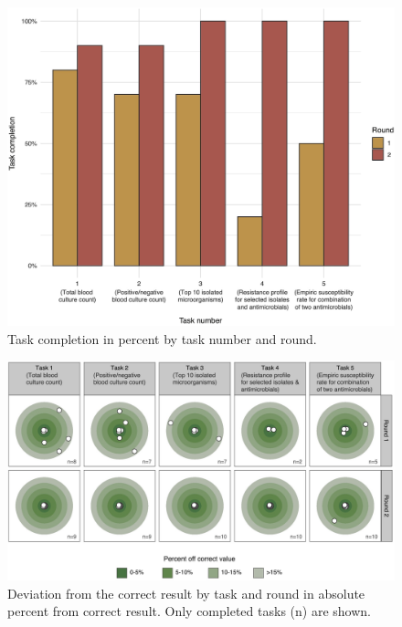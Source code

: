 \documentclass[
]{book}
\begin{document}
\begin{figure}

{\centering \includegraphics[width=1\linewidth]{images/06-05} 

}

\caption{Task completion in percent by task number and round.}\label{fig:fig6-5}
\end{figure}

\begin{figure}

{\centering \includegraphics[width=1\linewidth]{images/06-06} 

}

\caption{Deviation from the correct result by task and round in absolute percent from correct result. Only completed tasks (n) are shown.}\label{fig:fig6-6}
\end{figure}
\end{document}
